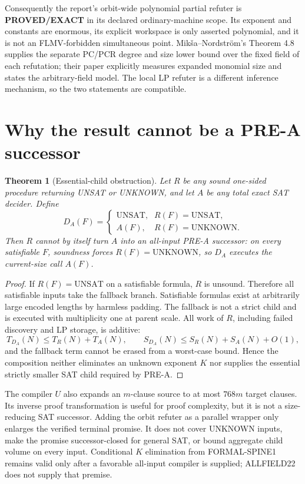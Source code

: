 \documentclass[11pt]{article}
\newtheorem{theorem}{Theorem}
\newcommand{\EXACT}{\textbf{PROVED/EXACT}}
\begin{document}
Consequently the report's orbit-wide polynomial partial refuter is
\EXACT{} in its declared ordinary-machine scope.  Its exponent and constants
are enormous, its explicit workspace is only asserted polynomial, and it is
not an FLMV-forbidden simultaneous point.  Mik\v{s}a--Nordstr\"om's Theorem
4.8 supplies the separate PC/PCR degree and size lower bound over the fixed
field of each refutation; their paper explicitly measures expanded monomial
size and states the arbitrary-field model.  The local LP refuter is a
different inference mechanism, so the two statements are compatible.

\section{Why the result cannot be a PRE-A successor}
\begin{theorem}[Essential-child obstruction]
Let $R$ be any sound one-sided procedure returning UNSAT or UNKNOWN, and let
$A$ be any total exact SAT decider.  Define
\[
 D_A(F)=\begin{cases}
 \text{UNSAT},&R(F)=\text{UNSAT},\\
 A(F),&R(F)=\text{UNKNOWN}.
 \end{cases}
\]
Then $R$ cannot by itself turn $A$ into an all-input PRE-A successor: on
every satisfiable $F$, soundness forces $R(F)=\text{UNKNOWN}$, so $D_A$
executes the current-size call $A(F)$.
\end{theorem}
\begin{proof}
If $R(F)=\text{UNSAT}$ on a satisfiable formula, $R$ is unsound.  Therefore
all satisfiable inputs take the fallback branch.  Satisfiable formulas exist
at arbitrarily large encoded lengths by harmless padding.  The fallback is
not a strict child and is executed with multiplicity one at parent scale.
All work of $R$, including failed discovery and LP storage, is additive:
\[
 T_{D_A}(N)\le T_R(N)+T_A(N),\qquad
 S_{D_A}(N)\le S_R(N)+S_A(N)+O(1),
\]
and the fallback term cannot be erased from a worst-case bound.  Hence the
composition neither eliminates an unknown exponent $K$ nor supplies the
essential strictly smaller SAT child required by PRE-A.
\end{proof}

The compiler $U$ also expands an $m$-clause source to at most $768m$ target
clauses.  Its inverse proof transformation is useful for proof complexity,
but it is not a size-reducing SAT successor.  Adding the orbit refuter as a
parallel wrapper only enlarges the verified terminal promise.  It does not
cover UNKNOWN inputs, make the promise successor-closed for general SAT, or
bound aggregate child volume on every input.  Conditional $K$ elimination
from FORMAL-SPINE1 remains valid only after a favorable all-input compiler is
supplied; ALLFIELD22 does not supply that premise.
\end{document}
